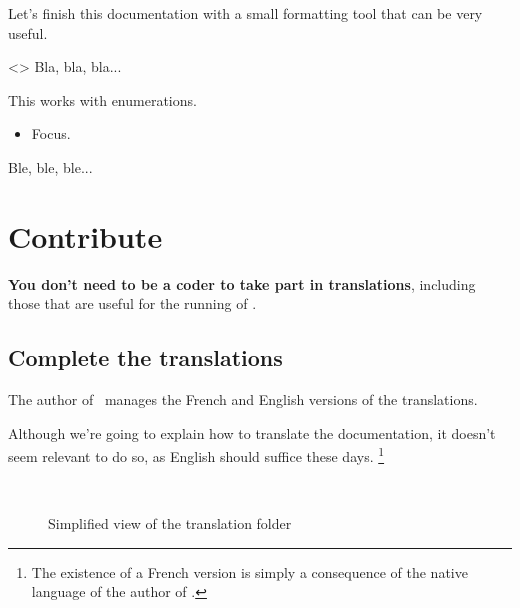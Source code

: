 Let's finish this documentation with a small formatting tool that can be very useful.


\begin{tdoclatex}<>
Bla, bla, bla...

\tdocsep %

This works with enumerations.

\begin{itemize}
    \item Focus.
\end{itemize}

\tdocsep %

Ble, ble, ble...
\end{tdoclatex}


\section{Contribute}

\begin{tdocnote}
    \textbf{You don't need to be a coder to take part in translations}, including those that are useful for the running of \thisproj.
\end{tdocnote}



\subsection{Complete the translations}

\begin{tdocnote}
    The author of \thisproj\ manages the French and English versions of the translations.
\end{tdocnote}


\begin{tdoccaut}
    Although we're going to explain how to translate the documentation, it doesn't seem relevant to do so, as English should suffice these days.%
    \footnote{
      The existence of a French version is simply a consequence of the native language of the author of \thisproj.
    }
\end{tdoccaut}


\begin{figure}[ht]
    \centering
    \contribtranslatedirtree\
    \caption{Simplified view of the translation folder}
    \label{tutodoc-contrib-translate-dir}
\end{figure}


